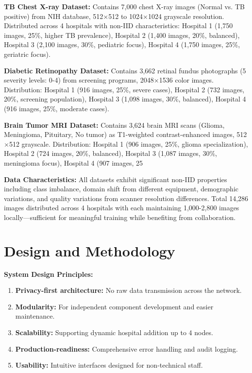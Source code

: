 \textbf{TB Chest X-ray Dataset:} Contains 7,000 chest X-ray images (Normal vs. TB positive) from NIH database, 512$\times$512 to 1024$\times$1024 grayscale resolution. Distributed across 4 hospitals with non-IID characteristics: Hospital 1 (1,750 images, 25\%, higher TB prevalence), Hospital 2 (1,400 images, 20\%, balanced), Hospital 3 (2,100 images, 30\%, pediatric focus), Hospital 4 (1,750 images, 25\%, geriatric focus).

\textbf{Diabetic Retinopathy Dataset:} Contains 3,662 retinal fundus photographs (5 severity levels: 0-4) from screening programs, 2048$\times$1536 color images. Distribution: Hospital 1 (916 images, 25\%, severe cases), Hospital 2 (732 images, 20\%, screening population), Hospital 3 (1,098 images, 30\%, balanced), Hospital 4 (916 images, 25\%, moderate cases).

\textbf{Brain Tumor MRI Dataset:} Contains 3,624 brain MRI scans (Glioma, Meningioma, Pituitary, No tumor) as T1-weighted contrast-enhanced images, 512$\times$512 grayscale. Distribution: Hospital 1 (906 images, 25\%, glioma specialization), Hospital 2 (724 images, 20\%, balanced), Hospital 3 (1,087 images, 30\%, meningioma focus), Hospital 4 (907 images, 25%

\textbf{Data Characteristics:} All datasets exhibit significant non-IID properties including class imbalance, domain shift from different equipment, demographic variations, and quality variations from scanner resolution differences. Total 14,286 images distributed across 4 hospitals with each maintaining 1,000-2,800 images locally—sufficient for meaningful training while benefiting from collaboration.

\section{Design and Methodology}

\textbf{System Design Principles:}
\begin{enumerate}
    \item \textbf{Privacy-first architecture:} No raw data transmission across the network.
    \item \textbf{Modularity:} For independent component development and easier maintenance.
    \item \textbf{Scalability:} Supporting dynamic hospital addition up to 4 nodes.
    \item \textbf{Production-readiness:} Comprehensive error handling and audit logging.
    \item \textbf{Usability:} Intuitive interfaces designed for non-technical staff.
\end{enumerate}

